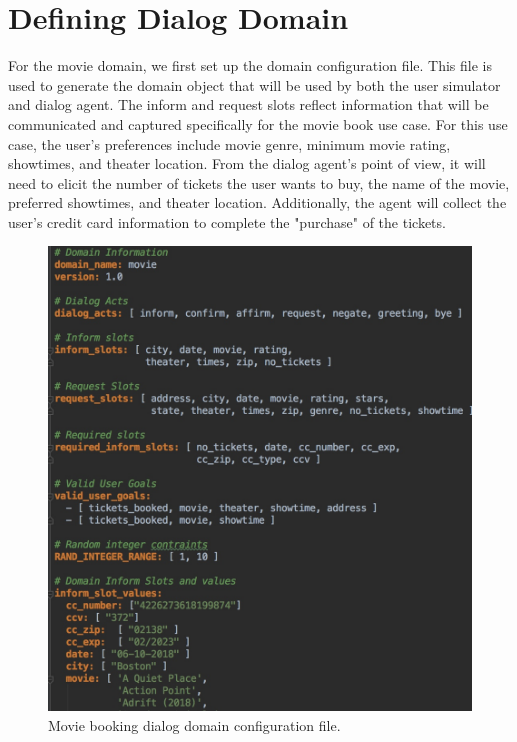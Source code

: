 \section{Defining Dialog Domain}

For the movie domain, we first set up the domain configuration file. This file is used to generate the domain object that will be used by both the user simulator and dialog agent. The inform and request slots reflect information that will be communicated and captured specifically for the movie book use case. For this use case, the user's preferences include movie genre, minimum movie rating, showtimes, and theater location. From the dialog agent's point of view, it will need to elicit the number of tickets the user wants to buy, the name of the movie, preferred showtimes, and theater location. Additionally, the agent will collect the user's credit card information to complete the "purchase" of the tickets. 

\begin{figure}[h!]
	\centering
	\includegraphics[scale=.25]{diagrams/movie_dialog_domain.jpeg}
	\caption{ Movie booking dialog domain configuration file. }
	\label{fig:movie_domain}
\end{figure}


